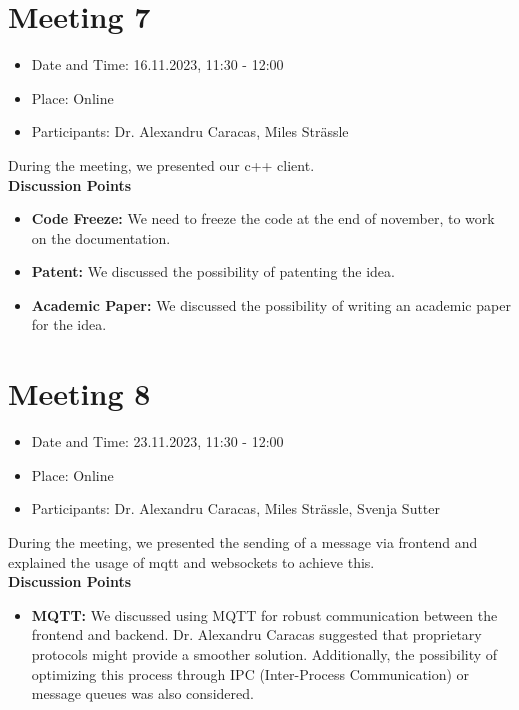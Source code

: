 \section{Meeting 7}

\begin{itemize}
    \item Date and Time: 16.11.2023, 11:30 - 12:00
    \item Place: Online
    \item Participants: Dr. Alexandru Caracas, Miles Strässle
\end{itemize}

\noindent During the meeting, we presented our c++ client.\\

\noindent\textbf{Discussion Points}
\begin{itemize}
    \item \textbf{Code Freeze:} We need to freeze the code at the end of november, to work on the documentation.
    \item \textbf{Patent:} We discussed the possibility of patenting the idea.
    \item \textbf{Academic Paper:} We discussed the possibility of writing an academic paper for the idea.
\end{itemize}

\section{Meeting 8}

\begin{itemize}
    \item Date and Time: 23.11.2023, 11:30 - 12:00
    \item Place: Online
    \item Participants: Dr. Alexandru Caracas, Miles Strässle, Svenja Sutter
\end{itemize}

\noindent During the meeting, we presented the sending of a message via frontend and explained the usage of mqtt and websockets to achieve this.\\

\noindent\textbf{Discussion Points}
\begin{itemize}
    \item \textbf{MQTT:} We discussed using MQTT for robust communication between the frontend and backend. Dr. Alexandru Caracas suggested that proprietary protocols might provide a smoother solution. Additionally, the possibility of optimizing this process through IPC (Inter-Process Communication) or message queues was also considered.
\end{itemize}

